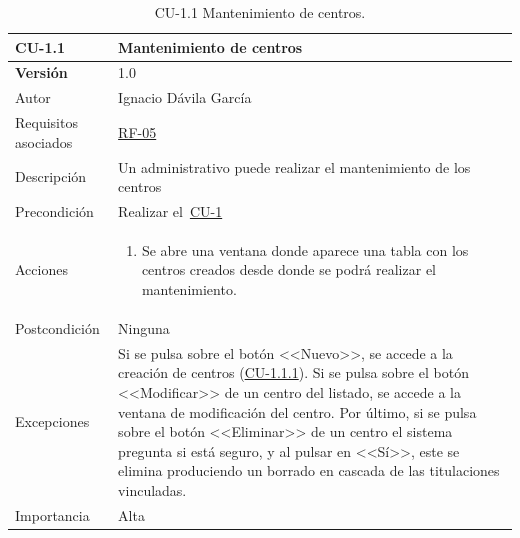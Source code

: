 \begin{table}[p]
	\centering
	\begin{tabularx}{\linewidth}{ p{} p{} }
		\toprule
		\textbf{CU-1.1}    & \textbf{Mantenimiento de centros}\\
		\toprule
		\textbf{Versión}              & 1.0    \\
		{\small Autor}                & Ignacio Dávila García \\
		{\small Requisitos asociados} & \hyperref[itm:RF5]{RF-05} \\
		{\small Descripción}          & Un administrativo puede realizar el mantenimiento de los centros \\
		{\small Precondición}         & Realizar el~\hyperref[table:CU-1]{CU-1} \\
		{\small Acciones}             &
		\begin{enumerate}
			\def\labelenumi{\arabic{enumi}.}
			\tightlist
			\item Se abre una ventana donde aparece una tabla con los centros creados desde donde se podrá realizar el mantenimiento.
		\end{enumerate}\\
		{\small Postcondición}        & Ninguna \\
		{\small Excepciones}          & Si se pulsa sobre el botón <<Nuevo>>, se accede a la creación de centros (\hyperref[table:CU-1_1_1]{CU-1.1.1}). Si se pulsa sobre el botón <<Modificar>> de un centro del listado, se accede a la ventana de modificación del centro. Por último, si se pulsa sobre el botón <<Eliminar>> de un centro el sistema pregunta si está seguro, y al pulsar en <<Sí>>, este se elimina produciendo un borrado en cascada de las titulaciones vinculadas. \\
		{\small Importancia}          & Alta \\
		\bottomrule
	\end{tabularx}
	\caption{CU-1.1 Mantenimiento de centros.}\label{table:CU-1_1}
\end{table}
\FloatBarrier

